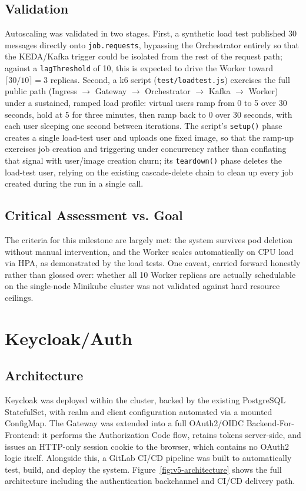 \documentclass[twoside]{supsistudent}
\begin{document}
\subsection{Validation}
Autoscaling was validated in two stages. First, a synthetic load test published 30 messages directly onto \texttt{job.requests}, bypassing the Orchestrator entirely so that the KEDA/Kafka trigger could be isolated from the rest of the request path; against a \texttt{lagThreshold} of 10, this is expected to drive the Worker toward $\lceil 30/10 \rceil = 3$ replicas. Second, a k6 script (\texttt{test/loadtest.js}) exercises the full public path (Ingress $\rightarrow$ Gateway $\rightarrow$ Orchestrator $\rightarrow$ Kafka $\rightarrow$ Worker) under a sustained, ramped load profile: virtual users ramp from 0 to 5 over 30 seconds, hold at 5 for three minutes, then ramp back to 0 over 30 seconds, with each user sleeping one second between iterations. The script's \texttt{setup()} phase creates a single load-test user and uploads one fixed image, so that the ramp-up exercises job creation and triggering under concurrency rather than conflating that signal with user/image creation churn; its \texttt{teardown()} phase deletes the load-test user, relying on the existing cascade-delete chain to clean up every job created during the run in a single call.

\subsection{Critical Assessment vs. Goal}
The criteria for this milestone are largely met: the system survives pod deletion without manual intervention, and the Worker scales automatically on CPU load via HPA, as demonstrated by the load tests. One caveat, carried forward honestly rather than glossed over: whether all 10 Worker replicas are actually schedulable on the single-node Minikube cluster was not validated against hard resource ceilings. 

\section{Keycloak/Auth}

\subsection{Architecture}
Keycloak was deployed within the cluster, backed by the existing PostgreSQL StatefulSet, with realm and client configuration automated via a mounted ConfigMap. The Gateway was extended into a full OAuth2/OIDC Backend-For-Frontend: it performs the Authorization Code flow, retains tokens server-side, and issues an HTTP-only session cookie to the browser, which contains no OAuth2 logic itself. Alongside this, a GitLab CI/CD pipeline was built to automatically test, build, and deploy the system. Figure~\ref{fig:v5-architecture} shows the full architecture including the authentication backchannel and CI/CD delivery path.
\end{document}

